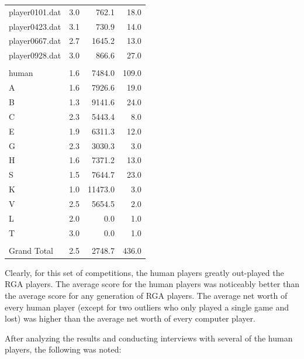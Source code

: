 \begin{table}[htbp]
\begin{tabular}{r|rrr}
          \hline
          \multicolumn{1}{l|}{player0101.dat} & 3.0    & 762.1  & 18.0 \\
          \multicolumn{1}{l|}{player0423.dat} & 3.1    & 730.9  & 14.0 \\
          \multicolumn{1}{l|}{player0667.dat} & 2.7    & 1645.2 & 13.0 \\
          \multicolumn{1}{l|}{player0928.dat} & 3.0    & 866.6  & 27.0 \\ \\
          \multicolumn{1}{l|}{human} & 1.6    & 7484.0 & 109.0 \\
          \hline
          \multicolumn{1}{l|}{A} & 1.6    & 7926.6 & 19.0 \\
          \multicolumn{1}{l|}{B} & 1.3    & 9141.6 & 24.0 \\
          \multicolumn{1}{l|}{C} & 2.3    & 5443.4 & 8.0 \\
          \multicolumn{1}{l|}{E} & 1.9    & 6311.3 & 12.0 \\
          \multicolumn{1}{l|}{G} & 2.3    & 3030.3 & 3.0 \\
          \multicolumn{1}{l|}{H} & 1.6    & 7371.2 & 13.0 \\
          \multicolumn{1}{l|}{S} & 1.5    & 7644.7 & 23.0 \\
          \multicolumn{1}{l|}{K} & 1.0    & 11473.0 & 3.0 \\
          \multicolumn{1}{l|}{V} & 2.5    & 5654.5 & 2.0 \\
          \multicolumn{1}{l|}{L} & 2.0    & 0.0    & 1.0 \\
          \multicolumn{1}{l|}{T} & 3.0    & 0.0    & 1.0 \\ \\
          \multicolumn{1}{l|}{Grand Total} & 2.5    & 2748.7 & 436.0 \\
          \bottomrule
          \end{tabular}%
        \label{tab:human_rga_I}%
      \end{table}%

Clearly, for this set of competitions, the human players greatly out-played the
RGA players. The average score for the human players was noticeably better than
the average score for any generation of RGA players. The average net worth of
every human player (except for two outliers who only played a single game and
lost) was higher than the average net worth of every computer player.

After analyzing the results and conducting interviews with several of the human
players, the following was noted:

